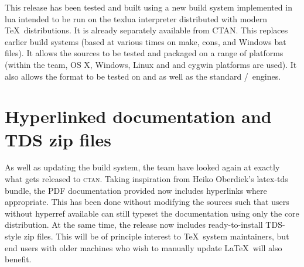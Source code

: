\documentclass{ltnews}
\begin{document}
This release has been tested and built using a new build system implemented in
\textsf{lua} intended to be run on the \textsf{texlua} interpreter distributed
with modern \TeX\ distributions. It is already separately available
from CTAN. This replaces earlier build systems (based at various times on
\textsf{make}, \textsf{cons}, and Windows \textsf{bat} files). It allows the
sources to be tested and packaged on a range of platforms (within the team,
OS X, Windows, Linux and and cygwin platforms are used). It also allows the
format to be tested on  and  as well as the
standard /\eTeX\ engines.

\section{Hyperlinked documentation and TDS zip files}

As well as updating the build system, the team have looked again at exactly
what gets released to \textsc{ctan}. Taking inspiration from Heiko Oberdiek's
\textsf{latex-tds} bundle, the PDF documentation provided now includes
hyperlinks where appropriate. This has been done without modifying the sources
such that users without \textsf{hyperref} available can still typeset the
documentation using only the core distribution. At the same time, the release
now includes ready-to-install TDS-style zip files. This will be of principle
interest to \TeX\ system maintainers, but end users with older machines who
wish to manually update \LaTeX\ will also benefit.
\end{document}
